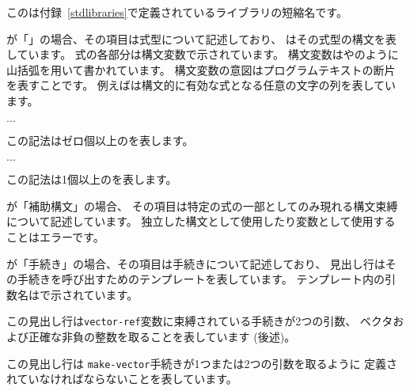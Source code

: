 このは付録~\ref{stdlibraries}で定義されているライブラリの短縮名です。

が「\exprtype」の場合、その項目は式型について記述しており、
はその式型の構文を表しています。
式の各部分は構文変数で示されています。
構文変数はやのように山括弧を用いて書かれています。
構文変数の意図はプログラムテキストの断片を表すことです。
例えばは構文的に有効な式となる任意の文字の列を表しています。
\begin{tabbing}
\qquad {} $\ldots$
\end{tabbing}
この記法はゼロ個以上のを表します。
\begin{tabbing}
\qquad {}  $\ldots$
\end{tabbing}
この記法は1個以上のを表します。

が「補助構文」の場合、
その項目は特定の式の一部としてのみ現れる構文束縛について記述しています。
独立した構文として使用したり変数として使用することはエラーです。

が「手続き」の場合、その項目は手続きについて記述しており、
見出し行はその手続きを呼び出すためのテンプレートを表しています。
テンプレート内の引数名はで示されています。

\noindent{}\unpenalty

この見出し行は{\tt vector-ref}変数に束縛されている手続きが2つの引数、
ベクタおよび正確な非負の整数を取ることを表しています
(後述)。

\noindent%
\unpenalty

この見出し行は
{\tt make-vector}手続きが1つまたは2つの引数を取るように
定義されていなければならないことを表しています。

